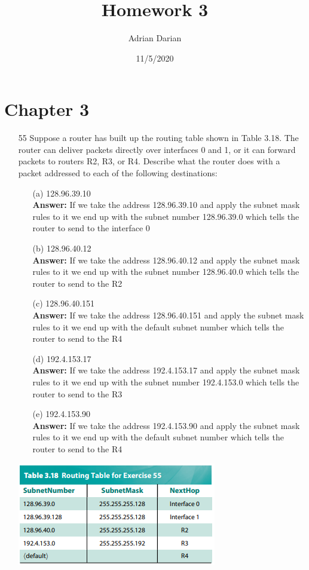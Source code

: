 \documentclass[a4paper]{article}
\title{Homework 3}
\author{Adrian Darian}
\date{11/5/2020}
\begin{document}
  
\maketitle
  
\section*{Chapter 3}
\begin{itemize}
	\item[55] Suppose a router has built up the routing table shown in Table 3.18. The router can deliver packets directly over interfaces 0 and 1, or it can forward packets to routers R2, R3, or R4. Describe what the router does with a packet addressed to each of the following destinations:
	      \begin{itemize}
	      	\item[(a)] 128.96.39.10 \\
	      	      \textbf{Answer:} If we take the address 128.96.39.10 and apply the subnet mask rules to it we end up with the subnet number 128.96.39.0 which tells the router to send to the interface 0
	      	\item[(b)] 128.96.40.12 \\
	      	      \textbf{Answer:} If we take the address 128.96.40.12 and apply the subnet mask rules to it we end up with the subnet number 128.96.40.0 which tells the router to send to the R2
	      	\item[(c)] 128.96.40.151 \\
	      	      \textbf{Answer:} If we take the address 128.96.40.151 and apply the subnet mask rules to it we end up with the default subnet number which tells the router to send to the R4
	      	\item[(d)] 192.4.153.17 \\
	      	      \textbf{Answer:} If we take the address 192.4.153.17 and apply the subnet mask rules to it we end up with the subnet number 192.4.153.0 which tells the router to send to the R3
	      	\item[(e)] 192.4.153.90	\\
	      	      \textbf{Answer:} If we take the address 192.4.153.90 and apply the subnet mask rules to it we end up with the default subnet number which tells the router to send to the R4
	      \end{itemize} 
	      \includegraphics{3-55.png} 

\end{itemize}
\end{document}
